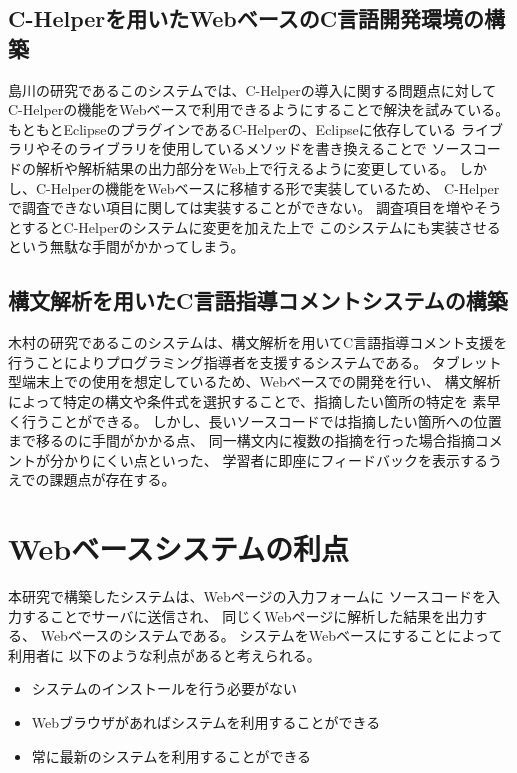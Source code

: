 \documentclass{csspaper}
\begin{document}
         \subsection{C-Helperを用いたWebベースのC言語開発環境の構築}
         島川の研究であるこのシステムでは、C-Helperの導入に関する問題点に対して
         C-Helperの機能をWebベースで利用できるようにすることで解決を試みている。
         もともとEclipseのプラグインであるC-Helperの、Eclipseに依存している
         ライブラリやそのライブラリを使用しているメソッドを書き換えることで
         ソースコードの解析や解析結果の出力部分をWeb上で行えるように変更している。
         しかし、C-Helperの機能をWebベースに移植する形で実装しているため、
         C-Helperで調査できない項目に関しては実装することができない。
         調査項目を増やそうとするとC-Helperのシステムに変更を加えた上で
         このシステムにも実装させるという無駄な手間がかかってしまう。

         \subsection{構文解析を用いたC言語指導コメントシステムの構築}
         木村の研究であるこのシステムは、構文解析を用いてC言語指導コメント支援を
         行うことによりプログラミング指導者を支援するシステムである。
         タブレット型端末上での使用を想定しているため、Webベースでの開発を行い、
         構文解析によって特定の構文や条件式を選択することで、指摘したい箇所の特定を
         素早く行うことができる。
         しかし、長いソースコードでは指摘したい箇所への位置まで移るのに手間がかかる点、
         同一構文内に複数の指摘を行った場合指摘コメントが分かりにくい点といった、
         学習者に即座にフィードバックを表示するうえでの課題点が存在する。
      
      \section{Webベースシステムの利点}
      本研究で構築したシステムは、Webページの入力フォームに
      ソースコードを入力することでサーバに送信され、
      同じくWebページに解析した結果を出力する、
      Webベースのシステムである。
      システムをWebベースにすることによって利用者に
      以下のような利点があると考えられる。

      \begin{itemize}
         \item システムのインストールを行う必要がない
         \item Webブラウザがあればシステムを利用することができる
         \item 常に最新のシステムを利用することができる
      \end{itemize}
\end{document}
